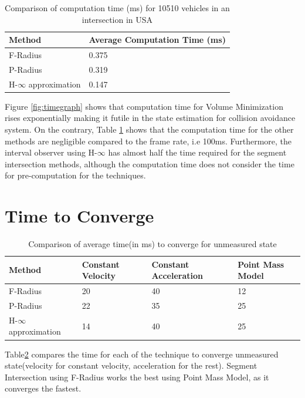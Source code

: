 \begin{table}[htbp]
\caption{Comparison of computation time (ms) for 10510 vehicles in an intersection in USA\\}
	\centering
	\renewcommand{\arraystretch}{1.1}
	\small	
	\begin{tabular}{l l}
		\toprule 
		\textbf{Method} & \textbf{Average Computation Time (ms)}\\ \midrule
		F-Radius & 0.375\\
		P-Radius &0.319\\
		H-$\infty$ approximation & 0.147\\
		\bottomrule
	\end{tabular}
	\label{tab:comptime}
\end{table}
Figure \ref{fig:timegraph} shows that computation time for Volume Minimization rises exponentially making it futile in the state estimation for collision avoidance system. On the contrary, Table \ref{tab:comptime} shows that the computation time for the other methods are negligible compared to the frame rate, i.e 100ms. Furthermore, the interval observer using H-$\infty$ has almost half the time required for the segment intersection methods, although the computation time does not consider the time for pre-computation for the techniques.



\section{Time to Converge}
\begin{table}[htbp]
\caption{Comparison of average time(in ms) to converge for unmeasured state\\}
	\centering
	\renewcommand{\arraystretch}{1.1}
	\small	
	\begin{tabular}{l l l l}
		\toprule 
		\textbf{Method} & \textbf{Constant Velocity} & \textbf{Constant Acceleration} & \textbf{Point Mass Model} \\ \midrule
		F-Radius & 20 & 40 & 12\\
		P-Radius & 22 & 35 & 25\\
		H-$\infty$ approximation & 14 & 40 & 25\\
		\bottomrule
	\end{tabular}
	\label{tab:convtime}
\end{table}
Table\ref{tab:convtime} compares the time for each of the technique to converge unmeasured state(velocity for constant velocity, acceleration for the rest). Segment Intersection using F-Radius works the best using Point Mass Model, as it converges the fastest.


